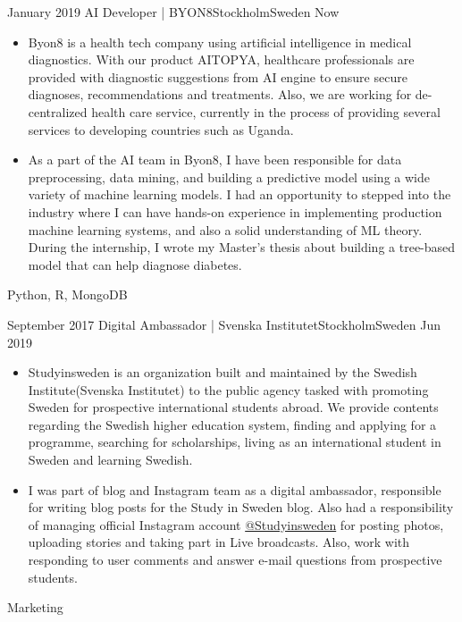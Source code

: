 %
%
%
\begin{experiences}
  \experience
    {January 2019} {AI Developer | BYON8}{Stockholm}{Sweden}
    {Now}    {\begin{itemize}
               \item Byon8 is a health tech company using artificial intelligence in medical diagnostics. With our product AITOPYA, healthcare professionals are provided with diagnostic suggestions from AI engine to ensure secure diagnoses, recommendations and treatments. Also, we are working for de-centralized health care service, currently in the process of providing several services to developing countries such as Uganda.
               \item As a part of the AI team in Byon8, I have been responsible for data preprocessing, data mining, and building a predictive model using a wide variety of machine learning models. I had an opportunity to stepped into the industry where I can have hands-on experience in implementing production machine learning systems, and also a solid understanding of ML theory. During the internship, I wrote my Master's thesis about building a tree-based model that can help diagnose diabetes.
               \end{itemize}}
            {Python, R, MongoDB}
  \emptySeparator
  
  
   \experience
    {September 2017} {Digital Ambassador | Svenska Institutet}{Stockholm}{Sweden}
    {Jun 2019}    {\begin{itemize}
               \item Studyinsweden is an organization built and maintained by the Swedish Institute(Svenska Institutet) to the public agency tasked with promoting Sweden for prospective international students abroad. We provide contents regarding the Swedish higher education system, finding and applying for a programme, searching for scholarships, living as an international student in Sweden and learning Swedish.
               \item I was part of blog and Instagram team as a digital ambassador, responsible for writing blog posts for the Study in Sweden blog. Also had a responsibility of managing official Instagram account \href{https://www.instagram.com/studyinsweden/}{@Studyinsweden} for posting photos, uploading stories and taking part in Live broadcasts. Also, work with responding to user comments and answer e-mail questions from prospective students.
               \end{itemize}}
            {Marketing}
  \emptySeparator
  

\end{experiences}
